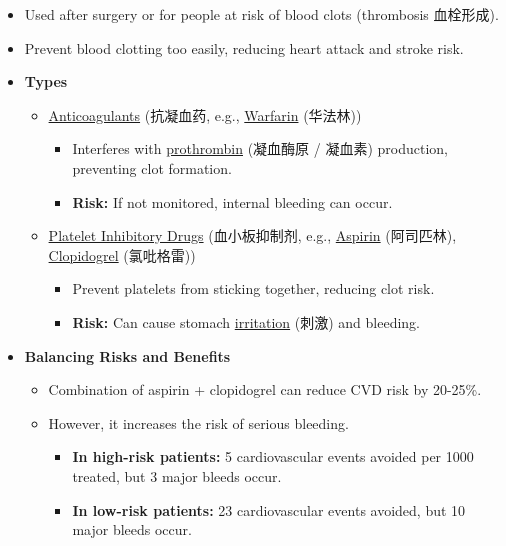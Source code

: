 \begin{itemize}
    \item Used after surgery or for people at risk of blood clots (thrombosis 血栓形成).
    \item Prevent blood clotting too easily, reducing heart attack and stroke risk.
    \item \textbf{Types}
    \begin{itemize}
        \item \underline{Anticoagulants} (抗凝血药, e.g., \underline{Warfarin} (华法林))
        \begin{itemize}
            \item Interferes with \underline{prothrombin} (凝血酶原 / 凝血素) production, preventing clot formation.
            \item \textbf{Risk:} If not monitored, internal bleeding can occur.
        \end{itemize}
        \item \underline{Platelet Inhibitory Drugs} (血小板抑制剂, e.g., \underline{Aspirin} (阿司匹林), \underline{Clopidogrel}
        (氯吡格雷))
        \begin{itemize}
            \item Prevent platelets from sticking together, reducing clot risk.
            \item \textbf{Risk:} Can cause stomach \underline{irritation} (刺激) and bleeding.
        \end{itemize}
    \end{itemize}
    \item \textbf{Balancing Risks and Benefits}
    \begin{itemize}
        \item Combination of aspirin + clopidogrel can reduce CVD risk by 20-25\%.
        \item However, it increases the risk of serious bleeding.
        \begin{itemize}
            \item \textbf{In high-risk patients:} 5 cardiovascular events avoided per 1000 treated, but 3 major bleeds occur.
            \item \textbf{In low-risk patients:} 23 cardiovascular events avoided, but 10 major bleeds occur.
        \end{itemize}
    \end{itemize}
\end{itemize}